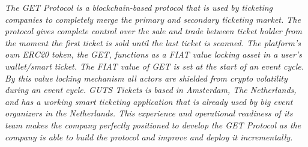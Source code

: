 \documentclass[letterpaper,10pt]{article}
\begin{document}
\begin{center}
\textit{The GET Protocol is a blockchain-based protocol that is used by ticketing companies to completely merge the primary and secondary ticketing market. The protocol gives complete control over the sale and trade between ticket holder from the moment the first ticket is sold until the last ticket is scanned. The platform's own ERC20 token, the GET, functions as a FIAT value locking asset in a user's wallet/smart ticket. The FIAT value of GET is set at the start of an event cycle. By this value locking mechanism all actors are shielded from crypto volatility during an event cycle. GUTS Tickets is based in Amsterdam, The Netherlands, and has a working smart ticketing application that is already used by big event organizers in the Netherlands. This experience and operational readiness of its team makes the company perfectly positioned to develop the GET Protocol as the company is able to build the protocol and improve and deploy it incrementally.}
\end{center}
\end{document}
